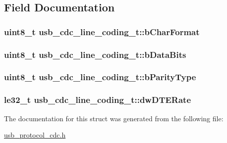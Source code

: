 \subsection{\-Field \-Documentation}
\hypertarget{structusb__cdc__line__coding__t_a7c8e804c8fc957f5a491c087ea35ea99}{
\subsubsection[{b\-Char\-Format}]{\setlength{\rightskip}{0pt plus 5cm}uint8\-\_\-t {\bf usb\-\_\-cdc\-\_\-line\-\_\-coding\-\_\-t\-::b\-Char\-Format}}}
\label{structusb__cdc__line__coding__t_a7c8e804c8fc957f5a491c087ea35ea99}
\hypertarget{structusb__cdc__line__coding__t_a37561226b9715655f328b565c641bbc2}{
\subsubsection[{b\-Data\-Bits}]{\setlength{\rightskip}{0pt plus 5cm}uint8\-\_\-t {\bf usb\-\_\-cdc\-\_\-line\-\_\-coding\-\_\-t\-::b\-Data\-Bits}}}
\label{structusb__cdc__line__coding__t_a37561226b9715655f328b565c641bbc2}
\hypertarget{structusb__cdc__line__coding__t_ab7d9dd2aa31399d37950a840d24b9026}{
\subsubsection[{b\-Parity\-Type}]{\setlength{\rightskip}{0pt plus 5cm}uint8\-\_\-t {\bf usb\-\_\-cdc\-\_\-line\-\_\-coding\-\_\-t\-::b\-Parity\-Type}}}
\label{structusb__cdc__line__coding__t_ab7d9dd2aa31399d37950a840d24b9026}
\hypertarget{structusb__cdc__line__coding__t_ab49d8ed399997154486fa93af54f02c2}{
\subsubsection[{dw\-D\-T\-E\-Rate}]{\setlength{\rightskip}{0pt plus 5cm}le32\-\_\-t {\bf usb\-\_\-cdc\-\_\-line\-\_\-coding\-\_\-t\-::dw\-D\-T\-E\-Rate}}}
\label{structusb__cdc__line__coding__t_ab49d8ed399997154486fa93af54f02c2}


\-The documentation for this struct was generated from the following file\-:\begin{DoxyCompactItemize}
\item 
\hyperlink{usb__protocol__cdc_8h}{usb\-\_\-protocol\-\_\-cdc.\-h}\end{DoxyCompactItemize}
